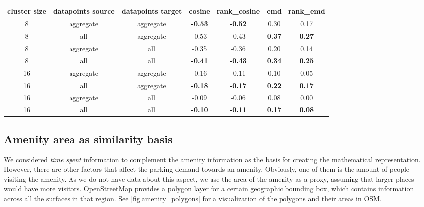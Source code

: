 	\begin{table}[!ht]
		{\begin{tabular}{ | c | c | c | c | c | c | c | }
				\hline
				{cluster size} & {datapoints source} & {datapoints target} & cosine & rank\_cosine & emd & rank\_emd \\ \hline
				8	&	aggregate 	&	aggregate 	& 	\textbf{-0.53}	&	\textbf{-0.52}	&	0.30	&	0.17 	\\ \hline
				8	&	all 		&	aggregate 	& 	-0.53	&	-0.43	&	\textbf{0.37}	&	\textbf{0.27}	\\ \hline \hline
				8	&	aggregate 	&	all 		& 	-0.35	&	-0.36	&	0.20	&	0.14	\\ \hline
				8	&	all			& 	all 		&	\textbf{-0.41}	&	\textbf{-0.43}	&	\textbf{0.34}	&	\textbf{0.25}	\\ \hline \hline
				16	&	aggregate	& 	aggregate 	&	-0.16	&	-0.11	&	0.10	&	0.05	\\ \hline
				16	&	all			& 	aggregate 	& 	\textbf{-0.18}	&	\textbf{-0.17}	&	\textbf{0.22}	&	\textbf{0.17}	\\ \hline \hline
				16	&	aggregate	& 	all 		& 	-0.09	&	-0.06	&	0.08	&	0.00	\\ \hline
				16	&	all			&	all 		&	\textbf{-0.10}	&	\textbf{-0.11}	&	\textbf{0.17}	&	\textbf{0.08}	\\ \hline \hline
		\end{tabular}}
		\label{tab:correlation_values}
	\end{table}
						
	\subsection{Amenity area as similarity basis}
	We considered \textit{time spent} information to complement the amenity information as the basis for creating the mathematical representation. However, there are other factors that affect the parking demand towards an amenity.
	Obviously, one of them is the amount of people visiting the amenity.
	As we do not have data about this aspect, we use the area of the amenity as a proxy, assuming that larger places would have more visitors.
	OpenStreetMap provides a polygon layer for a certain geographic bounding box, which contains information across all the surfaces in that region. See \cref{fig:amenity_polygons} for a visualization of the polygons and their areas in OSM. 
	
